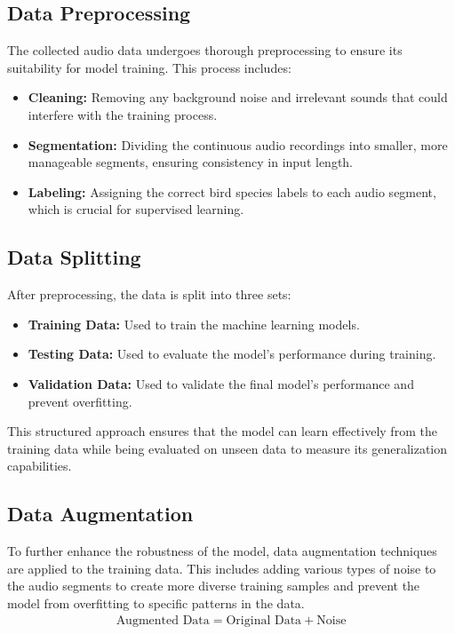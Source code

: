 \subsection{Data Preprocessing}

The collected audio data undergoes thorough preprocessing to ensure its suitability for model training. This process includes:
\begin{itemize}
    \item \textbf{Cleaning:} Removing any background noise and irrelevant sounds that could interfere with the training process.
    \item \textbf{Segmentation:} Dividing the continuous audio recordings into smaller, more manageable segments, ensuring consistency in input length.
    \item \textbf{Labeling:} Assigning the correct bird species labels to each audio segment, which is crucial for supervised learning.
\end{itemize}

\subsection{Data Splitting}

After preprocessing, the data is split into three sets:
\begin{itemize}
    \item \textbf{Training Data:} Used to train the machine learning models.
    \item \textbf{Testing Data:} Used to evaluate the model's performance during training.
    \item \textbf{Validation Data:} Used to validate the final model's performance and prevent overfitting.
\end{itemize}

This structured approach ensures that the model can learn effectively from the training data while being evaluated on unseen data to measure its generalization capabilities.

\subsection{Data Augmentation}

To further enhance the robustness of the model, data augmentation techniques are applied to the training data. This includes adding various types of noise to the audio segments to create more diverse training samples and prevent the model from overfitting to specific patterns in the data.
\begin{eqnarray}
    \text{Augmented Data} = \text{Original Data} + \text{Noise} 
\end{eqnarray}

